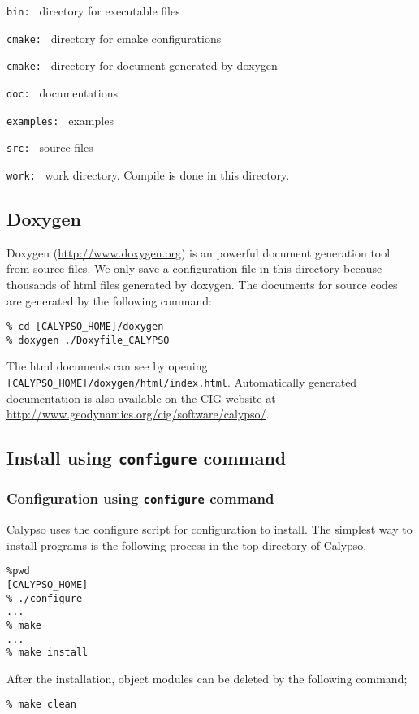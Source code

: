 \begin{description}
\item{\tt bin:      } directory for executable files
\item{\tt cmake:    } directory for cmake configurations
\item{\tt cmake:    } directory for document generated by doxygen
\item{\tt doc:      } documentations
\item{\tt examples: } examples
\item{\tt src:      } source files
\item{\tt work:     } work directory. Compile is done in this directory.
\end{description}

\subsection{Doxygen}
Doxygen (\url{http://www.doxygen.org}) is an powerful document generation tool from source files. We only save a configuration file in this directory because thousands of html files generated by doxygen. The documents for source codes are generated by the following command:
% 
\begin{verbatim}
% cd [CALYPSO_HOME]/doxygen
% doxygen ./Doxyfile_CALYPSO
\end{verbatim}
%
The html documents can see by opening \verb|[CALYPSO_HOME]/doxygen/html/index.html|.  Automatically generated documentation is also available on the CIG website at \url{http://www.geodynamics.org/cig/software/calypso/}.

\subsection{Install using {\tt configure} command }
\subsubsection{Configuration using {\tt configure} command }
Calypso uses the configure script for configuration to install. The simplest way to install programs is the following process in the top directory of Calypso.
% 
\begin{verbatim}
%pwd
[CALYPSO_HOME]
% ./configure
...
% make
...
% make install
\end{verbatim}
%
After the installation, object modules can be deleted by the following command;
% 
\begin{verbatim}
% make clean
\end{verbatim}
%

